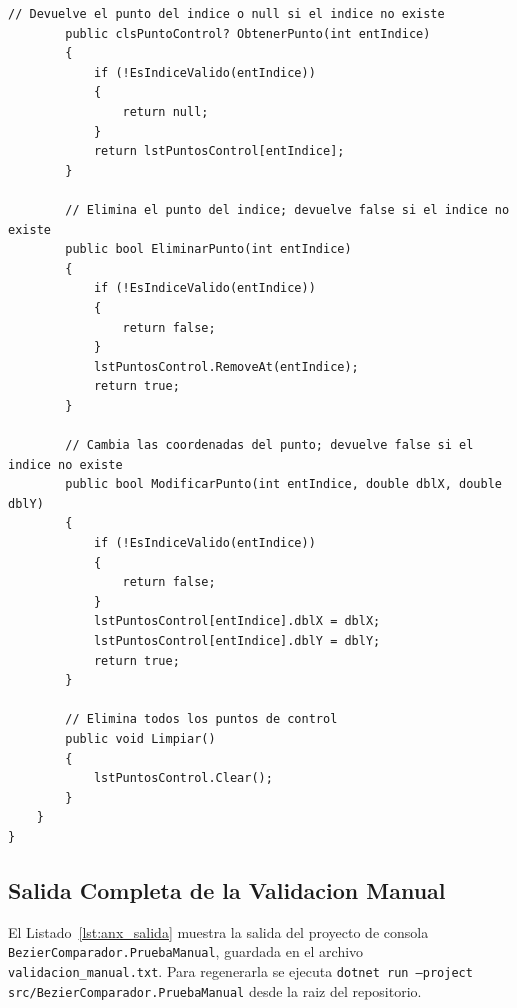 \begin{lstlisting}[language={[Sharp]C}, caption={Clase clsCurvaBezier (gestion de puntos de control y validaciones).}, label={lst:anx_curva}]
        // Devuelve el punto del indice o null si el indice no existe
        public clsPuntoControl? ObtenerPunto(int entIndice)
        {
            if (!EsIndiceValido(entIndice))
            {
                return null;
            }
            return lstPuntosControl[entIndice];
        }

        // Elimina el punto del indice; devuelve false si el indice no existe
        public bool EliminarPunto(int entIndice)
        {
            if (!EsIndiceValido(entIndice))
            {
                return false;
            }
            lstPuntosControl.RemoveAt(entIndice);
            return true;
        }

        // Cambia las coordenadas del punto; devuelve false si el indice no existe
        public bool ModificarPunto(int entIndice, double dblX, double dblY)
        {
            if (!EsIndiceValido(entIndice))
            {
                return false;
            }
            lstPuntosControl[entIndice].dblX = dblX;
            lstPuntosControl[entIndice].dblY = dblY;
            return true;
        }

        // Elimina todos los puntos de control
        public void Limpiar()
        {
            lstPuntosControl.Clear();
        }
    }
}
\end{lstlisting}


\subsection{Salida Completa de la Validacion Manual}
\label{subsec:anx_salida}

El Listado~\ref{lst:anx_salida} muestra la salida del proyecto de consola \texttt{BezierComparador.PruebaManual}, guardada en el archivo \texttt{validacion\_manual.txt}. Para regenerarla se ejecuta \texttt{dotnet run --project src/BezierComparador.PruebaManual} desde la raiz del repositorio.

